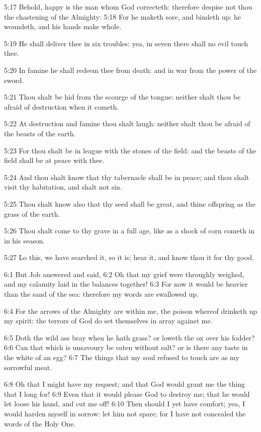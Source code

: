 5:17 Behold, happy is the man whom God correcteth: therefore despise
not thou the chastening of the Almighty: 5:18 For he maketh sore, and
bindeth up: he woundeth, and his hands make whole.

5:19 He shall deliver thee in six troubles: yea, in seven there shall
no evil touch thee.

5:20 In famine he shall redeem thee from death: and in war from the
power of the sword.

5:21 Thou shalt be hid from the scourge of the tongue: neither shalt
thou be afraid of destruction when it cometh.

5:22 At destruction and famine thou shalt laugh: neither shalt thou be
afraid of the beasts of the earth.

5:23 For thou shalt be in league with the stones of the field: and the
beasts of the field shall be at peace with thee.

5:24 And thou shalt know that thy tabernacle shall be in peace; and
thou shalt visit thy habitation, and shalt not sin.

5:25 Thou shalt know also that thy seed shall be great, and thine
offspring as the grass of the earth.

5:26 Thou shalt come to thy grave in a full age, like as a shock of
corn cometh in in his season.

5:27 Lo this, we have searched it, so it is; hear it, and know thou it
for thy good.

6:1 But Job answered and said, 6:2 Oh that my grief were throughly
weighed, and my calamity laid in the balances together!  6:3 For now
it would be heavier than the sand of the sea: therefore my words are
swallowed up.

6:4 For the arrows of the Almighty are within me, the poison whereof
drinketh up my spirit: the terrors of God do set themselves in array
against me.

6:5 Doth the wild ass bray when he hath grass? or loweth the ox over
his fodder?  6:6 Can that which is unsavoury be eaten without salt? or
is there any taste in the white of an egg?  6:7 The things that my
soul refused to touch are as my sorrowful meat.

6:8 Oh that I might have my request; and that God would grant me the
thing that I long for!  6:9 Even that it would please God to destroy
me; that he would let loose his hand, and cut me off!  6:10 Then
should I yet have comfort; yea, I would harden myself in sorrow: let
him not spare; for I have not concealed the words of the Holy One.

